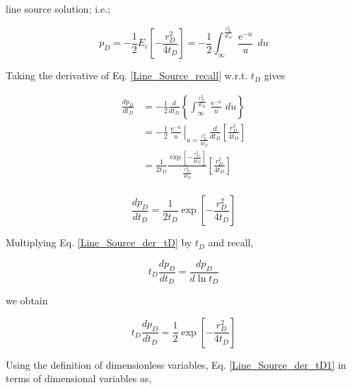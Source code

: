 \documentclass{llncs}
\numberwithin{equation}{section}
\numberwithin{figure}{section}
\numberwithin{table}{section}
\begin{document}
     line source solution; i.e.;

    \begin{equation}
        {{p}_{D}}=-\frac{1}{2}{{E}_{i}}\left[ -\frac{r_{D}^{2}}{4{{t}_{D}}} \right]=-\frac{1}{2}\int_{\infty }^{\frac{r_{D}^{2}}{4{{t}_{D}}}}{\frac{{{\operatorname{e}}^{-u}}}{u}}\,du
        \label{Line_Source_recall}
    \end{equation}

    Taking the derivative of Eq. \ref{Line_Source_recall} w.r.t. $t_{D}$ gives

    \begin{equation*}
    \begin{split}
     \frac{d{{p}_{D}}}{d{{t}_{D}}}&=-\frac{1}{2}\frac{d}{d{{t}_{D}}}\left\{ \int_{\infty }^{\frac{r_{D}^{2}}{4{{t}_{D}}}}{\frac{{{\operatorname{e}}^{-u}}}{u}}\,du \right\} \\
    & =-\frac{1}{2}{{\left. \frac{{{\operatorname{e}}^{-u}}}{u} \right|}_{u=\frac{r_{D}^{2}}{4{{t}_{D}}}}}\frac{d}{d{{t}_{D}}}\left[ \frac{r_{D}^{2}}{4{{t}_{D}}} \right] \\
    & =\frac{1}{2{{t}_{D}}}\frac{\exp \left[ -\frac{r_{D}^{2}}{4{{t}_{D}}} \right]}{\frac{r_{D}^{2}}{4{{t}_{D}}}}\left[ \frac{r_{D}^{2}}{4{{t}_{D}}} \right] \\
    \end{split}
    \end{equation*}

    \begin{equation}
        \frac{d{{p}_{D}}}{d{{t}_{D}}}=\frac{1}{2{{t}_{D}}}\exp \left[ -\frac{r_{D}^{2}}{4{{t}_{D}}} \right]
        \label{Line_Source_der_tD}
    \end{equation}


    Multiplying Eq. \ref{Line_Source_der_tD} by $t_{D}$ and recall,

    \begin{equation}
        {{t}_{D}}\frac{d{{p}_{D}}}{d{{t}_{D}}}=\frac{d{{p}_{D}}}{d\ln {{t}_{D}}}
        \label{dp_dlnt}
    \end{equation}

    we obtain

    \begin{equation}
        {{t}_{D}}\frac{d{{p}_{D}}}{d{{t}_{D}}}=\frac{1}{2}\exp \left[ -\frac{r_{D}^{2}}{4{{t}_{D}}} \right]
        \label{Line_Source_der_tD1}
    \end{equation}

    Using the definition of dimensionless variables, Eq. \ref{Line_Source_der_tD1}  in terms of dimensional variables as,
\end{document}
